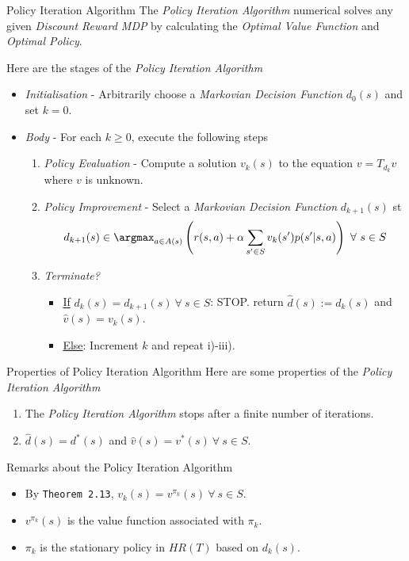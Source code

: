 \documentclass[11pt,a4paper]{article}
\begin{document}
  \begin{definition}{Policy Iteration Algorithm}
    The \textit{Policy Iteration Algorithm} numerical solves any given \textit{Discount Reward MDP} by calculating the \textit{Optimal Value Function} and \textit{Optimal Policy}.
    \par  Here are the stages of the \textit{Policy Iteration Algorithm}
    \begin{itemize}
      \item \textit{Initialisation} - Arbitrarily choose a \textit{Markovian Decision Function} $d_0(s)$ and set $k=0$.
      \item \textit{Body} - For each $k\geq0$, execute the following steps
      \begin{enumerate}
        \item \textit{Policy Evaluation} - Compute a solution $v_k(s)$ to the equation $v=T_{d_k}v$ where $v$ is unknown.
        \item \textit{Policy Improvement} - Select a \textit{Markovian Decision Function} $d_{k+1}(s)$ st
        \[ d_{k+1}(s)\in\argmax_{a\in A(s)}\left(r(s,a)+\alpha\sum_{s'\in S}v_k(s')p(s'|s,a)\right)\ \forall\ s\in S \]
        \item \textit{Terminate?}
        \begin{itemize}
          \item \underline{If} $d_k(s)=d_{k+1}(s)\ \forall\ s\in S$: STOP. return $\hat{d}(s):=d_k(s)$ and $\hat{v}(s)=v_k(s)$.
          \item \underline{Else}: Increment $k$ and repeat i)-iii).
        \end{itemize}
      \end{enumerate}
    \end{itemize}
  \end{definition}

  \begin{theorem}{Properties of Policy Iteration Algorithm}
    Here are some properties of the \textit{Policy Iteration Algorithm}
    \begin{enumerate}
      \item The \textit{Policy Iteration Algorithm} stops after a finite number of iterations.
      \item $\hat{d}(s)=d^*(s)$ and $\hat{v}(s)=v^*(s)\ \forall\ s\in S$.
    \end{enumerate}
  \end{theorem}

  \begin{remark}{Remarks about the Policy Iteration Algorithm}
    \begin{itemize}
      \item By \texttt{Theorem 2.13}, $v_k(s)=v^{\pi_k}(s)\ \forall\ s\in S$.
      \item $v^{\pi_k}(s)$ is the value function associated with $\pi_k$.
      \item $\pi_k$ is the stationary policy in $HR(T)$ based on $d_k(s)$.
    \end{itemize}
  \end{remark}
\end{document}
